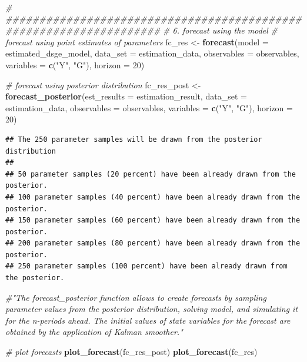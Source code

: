 \documentclass[12pt,a4paper,]{article}
\newcommand{\0}{\mathbf{0}}
\newenvironment{Shaded}{\begin{snugshade}}{\end{snugshade}}
\newcommand{\CommentTok}[1]{\textcolor[rgb]{0.56,0.35,0.01}{\textit{#1}}}
\newcommand{\DataTypeTok}[1]{\textcolor[rgb]{0.13,0.29,0.53}{#1}}
\newcommand{\DecValTok}[1]{\textcolor[rgb]{0.00,0.00,0.81}{#1}}
\newcommand{\KeywordTok}[1]{\textcolor[rgb]{0.13,0.29,0.53}{\textbf{#1}}}
\newcommand{\NormalTok}[1]{#1}
\newcommand{\StringTok}[1]{\textcolor[rgb]{0.31,0.60,0.02}{#1}}
\begin{document}
\begin{Shaded}
\begin{Highlighting}[]
\CommentTok{# ###################################################################}
\CommentTok{# 6. forecast using the model}
\CommentTok{# forecast using point estimates of parameters}
\NormalTok{fc_res <-}\StringTok{ }\KeywordTok{forecast}\NormalTok{(}\DataTypeTok{model =}\NormalTok{ estimated_dsge_model,}
                   \DataTypeTok{data_set =}\NormalTok{ estimation_data,}
                   \DataTypeTok{observables =}\NormalTok{ observables,}
                   \DataTypeTok{variables =} \KeywordTok{c}\NormalTok{(}\StringTok{"Y"}\NormalTok{, }\StringTok{"G"}\NormalTok{),}
                   \DataTypeTok{horizon =} \DecValTok{20}\NormalTok{)}

\CommentTok{# forecast using posterior distribution}
\NormalTok{fc_res_post <-}\StringTok{ }\KeywordTok{forecast_posterior}\NormalTok{(}\DataTypeTok{est_results =}\NormalTok{ estimation_result,}
                                  \DataTypeTok{data_set =}\NormalTok{ estimation_data,}
                                  \DataTypeTok{observables =}\NormalTok{ observables,}
                                  \DataTypeTok{variables =} \KeywordTok{c}\NormalTok{(}\StringTok{"Y"}\NormalTok{, }\StringTok{"G"}\NormalTok{),}
                                  \DataTypeTok{horizon =} \DecValTok{20}\NormalTok{)}
\end{Highlighting}
\end{Shaded}

\begin{verbatim}
## The 250 parameter samples will be drawn from the posterior distribution 
##  
## 50 parameter samples (20 percent) have been already drawn from the posterior.
## 100 parameter samples (40 percent) have been already drawn from the posterior.
## 150 parameter samples (60 percent) have been already drawn from the posterior.
## 200 parameter samples (80 percent) have been already drawn from the posterior.
## 250 parameter samples (100 percent) have been already drawn from the posterior.
\end{verbatim}

\begin{Shaded}
\begin{Highlighting}[]
\CommentTok{#"The forecast_posterior function allows to create forecasts by sampling parameter values from the posterior distribution, solving model, and simulating it for the n-periods ahead. The initial values of state variables for the forecast are obtained by the application of Kalman smoother."}

\CommentTok{# plot forecasts}
\KeywordTok{plot_forecast}\NormalTok{(fc_res_post)}
\KeywordTok{plot_forecast}\NormalTok{(fc_res)}
\end{Highlighting}
\end{Shaded}
\end{document}
